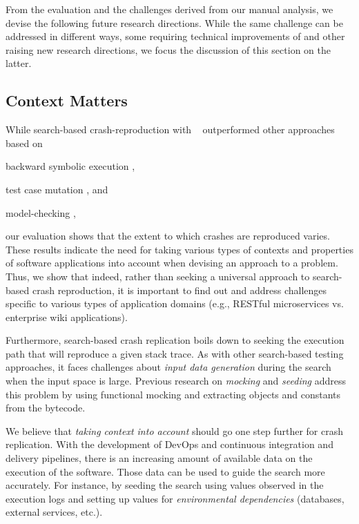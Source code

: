 
From the evaluation and the challenges derived from our manual analysis, we devise the following future research directions. 
While the same challenge can be addressed in different ways, some requiring technical improvements of \evocrash and other raising new research directions, we focus the discussion of this section on the latter. 

\subsection{Context Matters}

While search-based crash-reproduction with \evocrash~\cite{soltani2017,Soltani2018a} outperformed other approaches based on \begin{inparaenum}[(i)]
\item backward symbolic execution \cite{Chen2015},
\item test case mutation \cite{Xuan2015},
and \item model-checking \cite{Nayrolles2017},
\end{inparaenum}
our evaluation shows that the extent to which crashes are reproduced varies.
These results indicate the need for taking various types of contexts and properties of software applications into account when devising an approach to a problem.
Thus, we show that indeed, rather than seeking a universal approach to search-based crash reproduction, it is important to find out and address challenges specific to various types of application domains (e.g., RESTful microservices vs. enterprise wiki applications)\cite{Arcuri2017b}.

Furthermore, search-based crash replication boils down to seeking the execution path that will reproduce a given stack trace.
As with other search-based testing approaches, it faces challenges about \emph{input data generation} during the search when the input space is large.
Previous research on \textit{mocking} and \textit{seeding} \cite{arcuri2017private,Rojas2016} address this problem by using functional mocking and extracting objects and constants from the bytecode.

We believe that \emph{taking context into account} should go one step further for crash replication.
With the development of DevOps \cite{Roche2013} and continuous integration and delivery pipelines, there is an increasing amount of available data on the execution of the software.
Those data can be used to guide the search more accurately.
For instance, by seeding the search using values observed in the execution logs and setting up values for \emph{environmental dependencies} (databases, external services, etc.).


